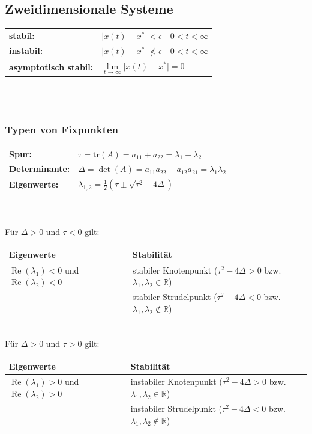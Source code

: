 \subsection{Zweidimensionale Systeme}

\begin{tabular}{ll}
	\textbf{stabil:} \qquad & $\lvert x(t) - x^*\rvert < \epsilon \quad 0 < t < \infty$ \\
	\textbf{instabil:} & $\lvert x(t) - x^*\rvert \nless \epsilon \quad 0 < t < \infty$ \\
	\textbf{asymptotisch stabil:} & $\lim\limits_{t \to \infty} \lvert x(t) - x^*\rvert = 0$ \\
\end{tabular}\\ \\

\subsubsection{Typen von Fixpunkten}

\begin{tabular}{ll}
	\textbf{Spur:} \qquad & $\tau = \mathrm{tr}(A) = a_{11} + a_{22} = \lambda_1 + \lambda_2$ \\
	\textbf{Determinante:} & $\Delta = \det(A) = a_{11}a_{22}  - a_{12}a_{21} = \lambda_1 \lambda_2$\\
	\textbf{Eigenwerte:} & $\lambda_{1,2} = \frac{1}{2} \left(\tau \pm \sqrt{\tau^2 - 4\Delta}\right)$ \\
\end{tabular}\\ \\

Für $\Delta > 0$ und $\tau < 0$ gilt: \\
\begin{tabular}{|p{5cm}|p{13cm}|}
\hline \textbf{Eigenwerte} & \textbf{Stabilität} \\ 
\hline $\operatorname{Re}(\lambda_1) < 0$ und $\operatorname{Re}(\lambda_2) < 0$ & stabiler Knotenpunkt ($\tau^2 - 4 \Delta > 0$ bzw. $ \lambda_1, \lambda_2 \in \mathbb{R}$) \\ 
 & stabiler Strudelpunkt ($\tau^2 - 4 \Delta < 0$ bzw. $ \lambda_1, \lambda_2 \notin \mathbb{R}$) \\
\hline 
\end{tabular} \\

Für $\Delta > 0$ und $\tau > 0$ gilt: \\
\begin{tabular}{|p{5cm}|p{13cm}|}
\hline \textbf{Eigenwerte} & \textbf{Stabilität} \\ 
\hline $\operatorname{Re}(\lambda_1) > 0$ und $\operatorname{Re}(\lambda_2) > 0$ & instabiler Knotenpunkt ($\tau^2 - 4 \Delta > 0$ bzw. $ \lambda_1, \lambda_2 \in \mathbb{R}$) \\ 
 & instabiler Strudelpunkt ($\tau^2 - 4 \Delta < 0$ bzw. $ \lambda_1, \lambda_2 \notin \mathbb{R}$) \\
\hline 
\end{tabular} \\


